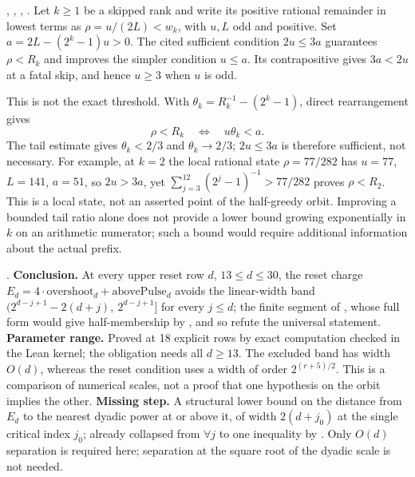 \begin{obs}
,
,
,
.
Let $k\ge1$ be a skipped rank and write its positive rational
remainder in lowest terms as $\rho=u/(2L)<w_k$, with $u,L$ odd and
positive.  Set $a=2L-(2^k-1)u>0$.  The cited sufficient condition
$2u\le3a$ guarantees $\rho<R_k$ and improves the simpler condition
$u\le a$.  Its contrapositive gives $3a<2u$ at a fatal skip,
and hence $u\ge3$ when $u$ is odd.

This is not the exact threshold.  With
$\theta_k=R_k^{-1}-(2^k-1)$, direct rearrangement gives
\[
 \rho<R_k\quad\Longleftrightarrow\quad u\theta_k<a.
\]
The tail estimate gives $\theta_k<2/3$ and $\theta_k\to2/3$;
$2u\le3a$ is therefore sufficient, not necessary.
For example, at $k=2$ the local rational state $\rho=77/282$ has
$u=77$, $L=141$, $a=51$, so $2u>3a$, yet
$\sum_{j=3}^{12}(2^j-1)^{-1}>77/282$ proves $\rho<R_2$.
This is a local state, not an asserted point of the half-greedy orbit.
Improving a bounded tail ratio alone does not provide a lower bound
growing exponentially in $k$ on an arithmetic numerator; such a bound
would require additional information about the actual prefix.
\end{obs}

\begin{obs}
.
\textbf{Conclusion.} At every upper reset row $d$, $13 \le d \le 30$, the reset charge $E_d =
4\cdot\mathrm{overshoot}_d + \mathrm{abovePulse}_d$ avoids the linear-width band
$(2^{d-j+1}-2(d+j),\ 2^{d-j+1}]$ for every $j \le d$; the finite segment of
, whose full
form would give half-membership by
,
and so refute the universal statement.
\textbf{Parameter range.} Proved at 18 explicit rows by exact computation checked in the Lean
kernel; the obligation needs all $d \ge 13$. The excluded band has width $O(d)$, whereas the reset condition uses
a width of order $2^{(r+5)/2}$.  This is a comparison of numerical scales,
not a proof that one hypothesis on the orbit implies the other.
\textbf{Missing step.} A structural lower bound on the distance from $E_d$ to the nearest dyadic
power at or above it, of width $2(d+j_0)$ at the single critical index $j_0$; already collapsed
from $\forall j$ to one inequality by
.
Only $O(d)$ separation is required here; separation at the square root of the dyadic scale is not needed.
\end{obs}

